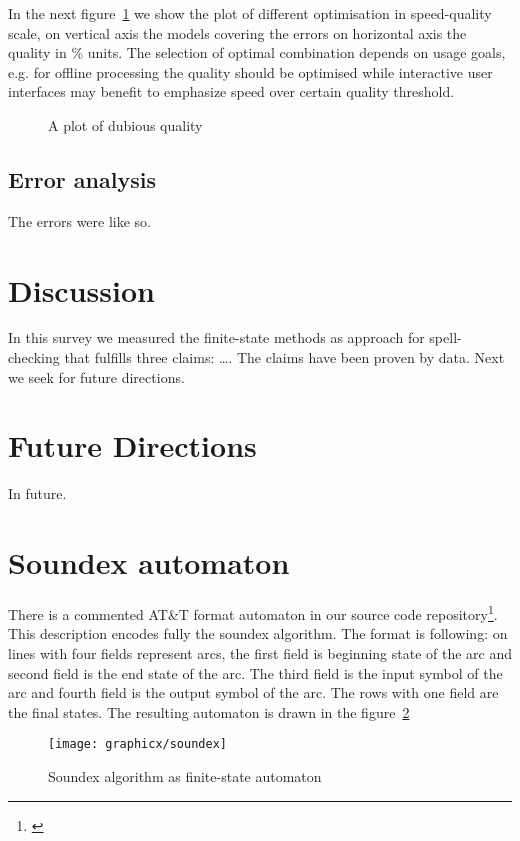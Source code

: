 \documentclass[a4paper,12pt]{article}
\begin{document}
In the next figure~\ref{fig:optimisation-speed-quality} we show the plot of
different optimisation in speed-quality scale, on vertical axis the models
covering the errors on horizontal axis the quality in \% units. The selection
of optimal combination depends on usage goals, e.g. for offline processing
the quality should be optimised while interactive user interfaces may benefit
to emphasize speed over certain quality threshold.

\begin{figure}
    \centering
    \caption{A plot of dubious quality
    \label{fig:optimisation-speed-quality}}
\end{figure}

\subsection{Error analysis}
\label{subsec:error-analysis}

The errors were like so.

\section{Discussion}
\label{sec:discussion}

In this survey we measured the finite-state methods as approach for
spell-checking that fulfills three claims: \ldots. The claims have been proven
by data. Next we seek for future directions.

\section{Future Directions}
\label{sec:future}

In future.



\section*{Soundex automaton}
\label{appendix:soundex}

There is a commented AT\&T format automaton in our source code
repository\footnote{\url{}}. This description encodes fully the soundex
algorithm.  The format is following: on lines with four fields represent arcs,
the first field is beginning state of the arc and second field is the end state
of the arc. The third field is the input symbol of the arc and fourth field is
the output symbol of the arc. The rows with one field are the final states. The
resulting automaton is drawn in the figure~\ref{fig:soundex}

\begin{figure}
    \centering
    \texttt{[image: graphicx/soundex]}
    \caption{Soundex algorithm as finite-state automaton
    \label{fig:soundex}}
\end{figure}
\end{document}

